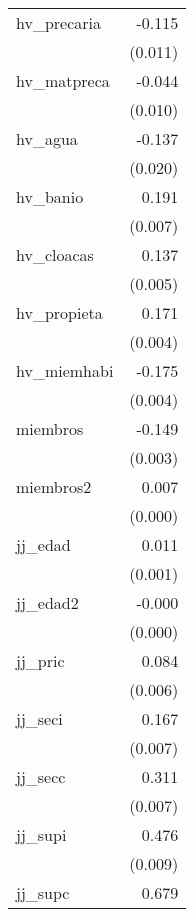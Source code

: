{\begin{longtable}{l*{1}{D{.}{.}{-1}}}
\addlinespace
hv\_precaria &      -0.115\sym{***}\\
            &     (0.011)         \\
\addlinespace
hv\_matpreca &      -0.044\sym{***}\\
            &     (0.010)         \\
\addlinespace
hv\_agua     &      -0.137\sym{***}\\
            &     (0.020)         \\
\addlinespace
hv\_banio    &       0.191\sym{***}\\
            &     (0.007)         \\
\addlinespace
hv\_cloacas  &       0.137\sym{***}\\
            &     (0.005)         \\
\addlinespace
hv\_propieta &       0.171\sym{***}\\
            &     (0.004)         \\
\addlinespace
hv\_miemhabi &      -0.175\sym{***}\\
            &     (0.004)         \\
\addlinespace
miembros    &      -0.149\sym{***}\\
            &     (0.003)         \\
\addlinespace
miembros2   &       0.007\sym{***}\\
            &     (0.000)         \\
\addlinespace
jj\_edad     &       0.011\sym{***}\\
            &     (0.001)         \\
\addlinespace
jj\_edad2    &      -0.000\sym{***}\\
            &     (0.000)         \\
\addlinespace
jj\_pric     &       0.084\sym{***}\\
            &     (0.006)         \\
\addlinespace
jj\_seci     &       0.167\sym{***}\\
            &     (0.007)         \\
\addlinespace
jj\_secc     &       0.311\sym{***}\\
            &     (0.007)         \\
\addlinespace
jj\_supi     &       0.476\sym{***}\\
            &     (0.009)         \\
\addlinespace
jj\_supc     &       0.679\sym{***}\\

\end{longtable}}
